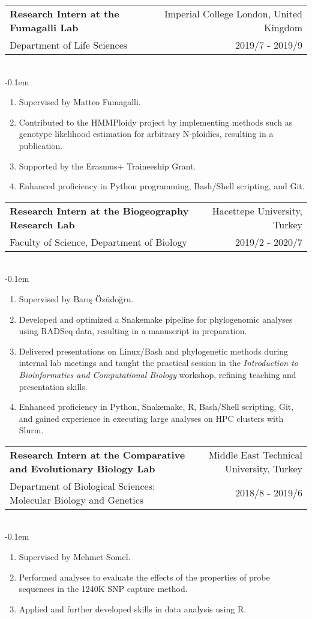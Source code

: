 \documentclass[letterpaper,10.5pt]{article}
\makeatletter
\newcommand{\cvSubheading}[5]{
  \vspace{-1pt}\item
    \begin{tabular*}{0.97\textwidth}{l@{\extracolsep{\fill}}r}
      \textbf{#1} & #2 \\
      {\small#3} & {\small #4} \\
    \end{tabular*}\vspace{3pt} \\
    #5
}
\makeatother
\begin{document}
    \medskip
    
    \cvSubheading
      {Research Intern at the Fumagalli Lab}
      {Imperial College London, United Kingdom}
      {Department of Life Sciences}
      {2019/7 - 2019/9}
          \vspace{-0.1em} \begin{enumerate}[label=\textbf{-},nosep,wide,  labelindent=0pt]
        \item Supervised by Matteo Fumagalli.
        \item Contributed to the HMMPloidy project by implementing methods such as genotype likelihood estimation for arbitrary N-ploidies, resulting in a publication.
        \item Supported by the Erasmus+ Traineeship Grant.
        \item Enhanced proficiency in Python programming, Bash/Shell scripting, and Git.
    \end{enumerate}
    \medskip

    \cvSubheading
      {Research Intern at the Biogeography Research Lab}
      {Hacettepe University, Turkey}
      {Faculty of Science, Department of Biology}
      {2019/2 - 2020/7}
          \vspace{-0.1em} \begin{enumerate}[label=\textbf{-},nosep,wide,  labelindent=0pt]
        \item Supervised by Bar{\i}\c{s} \"{O}z\"{u}do\u{g}ru.
        \item Developed and optimized a Snakemake pipeline for phylogenomic analyses using RADSeq data, resulting in a manuscript in preparation.
        \item Delivered presentations on Linux/Bash and phylogenetic methods during internal lab meetings and taught the practical session in the \textit{Introduction to Bioinformatics and Computational Biology} workshop, refining teaching and presentation skills.
        \item Enhanced proficiency in Python, Snakemake, R, Bash/Shell scripting, Git, and gained experience in executing large analyses on HPC clusters with Slurm.
    \end{enumerate}
    \medskip
 
    \cvSubheading
    {Research Intern at the Comparative and Evolutionary Biology Lab}
    {Middle East Technical University, Turkey}
    {Department of Biological Sciences: Molecular Biology and Genetics}
    {2018/8 - 2019/6}
          \vspace{-0.1em} \begin{enumerate}[label=\textbf{-},nosep,wide,  labelindent=0pt]
        \item Supervised by Mehmet Somel.
        \item Performed analyses to evaluate the effects of the properties of probe sequences in the 1240K SNP capture method.
        \item Applied and further developed skills in data analysis using R.

      \end{enumerate}
    \medskip
\end{document}

